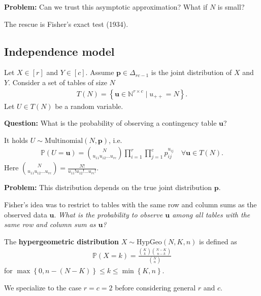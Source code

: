 \textbf{Problem:} Can we trust this asymptotic approximation? What if \( N \) is small? 

The rescue is Fisher's exact test (1934).

\subsection{Independence model}

Let \( X \in [r] \) and \( Y \in [c] \). Assume \( \mathbf p \in \Delta_{rc - 1} \) is the joint distribution of \( X \) and \( Y \).
Consider a set of tables of size \( N \)
\begin{align*}
  T(N) = \left\{ \mathbf u \in \mathbb{N}^{r \times c} \mid u_{++} = N \right\}.
\end{align*}
Let \( U \in T(N) \) be a random variable. 

\textbf{Question:} What is the probability of observing a contingency table \( \mathbf u \)?
\begin{prop}
  It holds \( U \sim \mathrm{Multinomial}(N,\mathbf p) \), i.e.
  \begin{align*}
    \mathbb{P}(U = \mathbf u) = {N \choose u_{11}u_{12}...u_{rc}} \prod^r_{i=1} \prod^c_{j=1} p_{ij}^{u_{ij}} \quad \forall \mathbf{u} \in T(N).
  \end{align*}
  Here \( {N \choose u_{11}u_{12}...u_{rc}} = \frac{N!}{u_{11}!u_{12}! \dots u_{rc}!} \).
\end{prop}
\textbf{Problem: }This distribution depends on the true joint distribution \( \mathbf p \).

Fisher's idea was to restrict to tables with the same row and column sums as the observed data \( \mathbf u \). \emph{What is the probability to observe \( \mathbf u \) among all tables with the same row and column sum as \( \mathbf u \)?}

\begin{defi}
  The \textbf{hypergeometric distribution} \( X \sim \mathrm{HypGeo}(N, K, n) \) is defined as 
  \begin{align*}
    \mathbb{P}(X = k) = \frac{{K \choose k} {N - K \choose n - k}}{{N \choose n}}
  \end{align*}
  for \( \max\left\{ 0, n - (N - K) \right\} \leq k \leq
   \min\left\{ K, n \right\} \).
\end{defi}

We specialize to the case \( r=c=2 \) before considering general \( r \) and \( c \).

